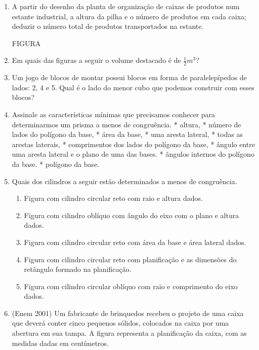 \begin{enumerate}
\item {} 
A partir do desenho da planta de organização de caixas de produtos num estante industrial, a altura da pilha e o número de produtos em cada caixa; deduzir o número total de produtos transportados na estante.

FIGURA

\item {} 
Em quais das figuras a seguir o volume destacado é de \(\frac{1}{2}m^3\)?

\item {} 
Um jogo de blocos de montar possui blocos em forma de paralelepípedos de lados: 2, 4 e 5. Qual é o lado do menor cubo que podemos construir com esses blocos?

\item {} 
Assinale as características mínimas que precisamos conhecer para determinarmos um prisma a menos de congruência.
* altura,
* número de lados do polígono da base,
* área da base,
* uma aresta lateral,
* todas as arestas laterais,
* comprimentos dos lados do polígono da base,
* ângulo entre uma aresta lateral e o plano de uma das bases.
* ângulos internos do polígono da base.
* polígono da base.

\item {} 
Quais dos cilindros a seguir estão determinados a menos de congruência.
\begin{enumerate}
\item {} 
Figura com cilindro circular reto com raio e altura dados.

\item {} 
Figura com cilindro oblíquo com ângulo do eixo com o plano e altura dados.

\item {} 
Figura com cilindro circular reto com área da base e área lateral dados.

\item {} 
Figura com cilindro circular reto com planificação e as dimensões do retângulo formado na planificação.

\item {} 
Figura com cilindro circular oblíquo com raio e comprimento  do eixo dados.

\end{enumerate}

\item {} 
(Enem 2001)  Um fabricante de brinquedos recebeu o projeto de uma caixa que deverá conter cinco pequenos sólidos, colocados na caixa por uma abertura em sua tampa. A figura representa a planificação da caixa, com as medidas dadas em centímetros.

\end{enumerate}